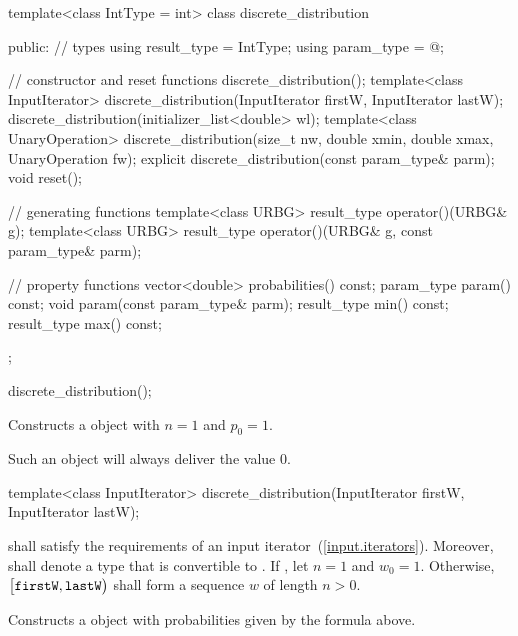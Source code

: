 %
\begin{codeblock}
template<class IntType = int>
  class discrete_distribution {
  public:
    // types
    using result_type = IntType;
    using param_type  = @\unspec@;

    // constructor and reset functions
    discrete_distribution();
    template<class InputIterator>
      discrete_distribution(InputIterator firstW, InputIterator lastW);
    discrete_distribution(initializer_list<double> wl);
    template<class UnaryOperation>
      discrete_distribution(size_t nw, double xmin, double xmax, UnaryOperation fw);
    explicit discrete_distribution(const param_type& parm);
    void reset();

    // generating functions
    template<class URBG>
      result_type operator()(URBG& g);
    template<class URBG>
      result_type operator()(URBG& g, const param_type& parm);

    // property functions
    vector<double> probabilities() const;
    param_type param() const;
    void param(const param_type& parm);
    result_type min() const;
    result_type max() const;
  };
\end{codeblock}

\begin{itemdecl}
discrete_distribution();
\end{itemdecl}

\begin{itemdescr}
\pnum\effects Constructs a  object
 with $ n = 1 $
 and $ p_0 = 1 $.
 \begin{note}
   Such an object will always deliver the value $0$.
 \end{note}
\end{itemdescr}


%
\begin{itemdecl}
template<class InputIterator>
  discrete_distribution(InputIterator firstW, InputIterator lastW);
\end{itemdecl}

\begin{itemdescr}
\pnum\requires
   shall satisfy the requirements
  of an input iterator~(\ref{input.iterators}).
  Moreover,
  shall denote a type that is convertible to .
 If ,
 let $ n = 1 $
 and $ w_0 = 1 $.
 Otherwise,
 $\bigl[\texttt{firstW}, \texttt{lastW}\bigr)$
 shall form a sequence $w$ of length $n > 0$.

\pnum\effects Constructs a  object
 with probabilities given by the formula above.
\end{itemdescr}


